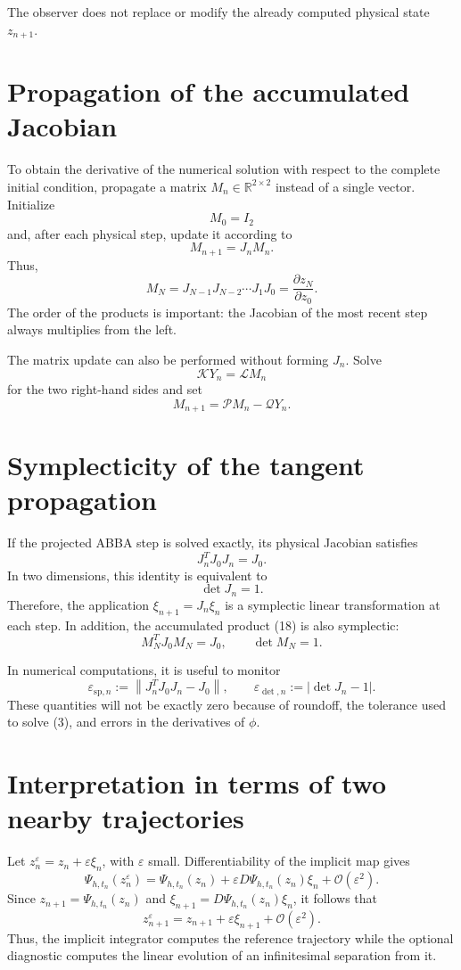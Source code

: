 \documentclass[11pt,a4paper]{article}
\newcommand{\R}{\mathbb{R}}
\newcommand{\norm}[1]{\left\lVert #1\right\rVert}
\begin{document}
The observer does not replace or modify the already computed physical state
$z_{n+1}$.

\section{Propagation of the accumulated Jacobian}

To obtain the derivative of the numerical solution with respect to the complete initial
condition, propagate a matrix $M_n\in\R^{2\times2}$ instead of a single vector. Initialize
\[
 M_0=I_2
\]
and, after each physical step, update it according to
\[
 \boxed{
 M_{n+1}=J_nM_n.
 }
 \tag{18}
\]
Thus,
\[
 M_N=J_{N-1}J_{N-2}\cdots J_1J_0
 =\frac{\partial z_N}{\partial z_0}.
\]
The order of the products is important: the Jacobian of the most recent step always
multiplies from the left.

The matrix update can also be performed without forming $J_n$. Solve
\[
 \mathcal K Y_n=\mathcal L M_n
\]
for the two right-hand sides and set
\[
 \boxed{
 M_{n+1}=\mathcal P M_n-\mathcal QY_n.
 }
 \tag{19}
\]

\section{Symplecticity of the tangent propagation}

If the projected ABBA step is solved exactly, its physical Jacobian satisfies
\[
 J_n^TJ_0J_n=J_0.
\]
In two dimensions, this identity is equivalent to
\[
 \det J_n=1.
\]
Therefore, the application $\xi_{n+1}=J_n\xi_n$ is a symplectic linear transformation at
each step. In addition, the accumulated product (18) is also symplectic:
\[
 M_N^TJ_0M_N=J_0,
 \qquad
 \det M_N=1.
\]

In numerical computations, it is useful to monitor
\[
 \varepsilon_{\mathrm{sp},n}
 :=\norm{J_n^TJ_0J_n-J_0},
 \qquad
 \varepsilon_{\det,n}:=\lvert\det J_n-1\rvert.
\]
These quantities will not be exactly zero because of roundoff, the tolerance used to
solve (3), and errors in the derivatives of $\phi$.

\section{Interpretation in terms of two nearby trajectories}

Let $z_n^\varepsilon=z_n+\varepsilon\xi_n$, with $\varepsilon$ small. Differentiability of
the implicit map gives
\[
 \Psi_{h,t_n}(z_n^\varepsilon)
 =\Psi_{h,t_n}(z_n)
 +\varepsilon D\Psi_{h,t_n}(z_n)\xi_n
 +\mathcal O(\varepsilon^2).
\]
Since $z_{n+1}=\Psi_{h,t_n}(z_n)$ and
$\xi_{n+1}=D\Psi_{h,t_n}(z_n)\xi_n$, it follows that
\[
 z_{n+1}^\varepsilon
 =z_{n+1}+\varepsilon\xi_{n+1}+\mathcal O(\varepsilon^2).
\]
Thus, the implicit integrator computes the reference trajectory while the optional
diagnostic computes the linear evolution of an infinitesimal separation from it.
\end{document}
